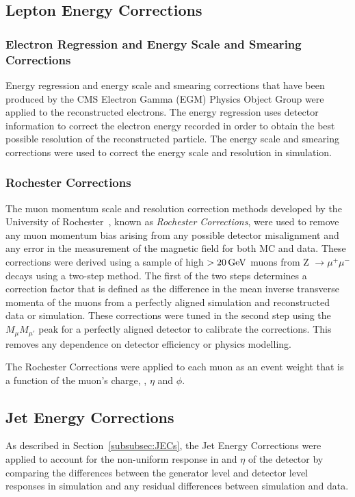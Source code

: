 \subsection{Lepton Energy Corrections}\label{subsec:leptonEnergyCorrections}
\subsubsection{Electron Regression and Energy Scale and Smearing Corrections}
Energy regression and energy scale and smearing corrections that have been produced by the CMS Electron Gamma (EGM) Physics Object Group were applied to the reconstructed electrons.
The energy regression uses detector information to correct the electron energy recorded in order to obtain the best possible resolution of the reconstructed particle.
The energy scale and smearing corrections were used to correct the energy scale and resolution in simulation.

\subsubsection{Rochester Corrections}
The muon momentum scale and resolution correction methods developed by the University of Rochester~\cite{rochester}, known as \emph{Rochester Corrections}, were used to remove any muon momentum bias arising from any possible detector misalignment and any error in the measurement of the magnetic field for both MC and data.
These corrections were derived using a sample of high \pt $> 20\,\text{Ge\hspace{-.08em}V}$ muons from Z $ \rightarrow \mu^{+}\mu^{-}$ decays using a two-step method.
The first of the two steps determines a correction factor that is defined as the difference in the mean inverse transverse momenta of the muons from a perfectly aligned simulation and reconstructed data or simulation.
These corrections were tuned in the second step using the $M_{\mu}M_{\mu\prime}$ peak for a perfectly aligned detector to calibrate the corrections.
This removes any dependence on detector efficiency or physics modelling.

The Rochester Corrections were applied to each muon as an event weight that is a function of the muon's charge, \pt, $\eta$ and $\phi$.

\subsection{Jet Energy Corrections}\label{subsec:jesjer}
As described in Section~\ref{subsubsec:JECs}, the Jet Energy Corrections were applied to account for the non-uniform response in \pT and $\eta$ of the detector by comparing the differences between the generator level and detector level responses in simulation and any residual differences between simulation and data.

